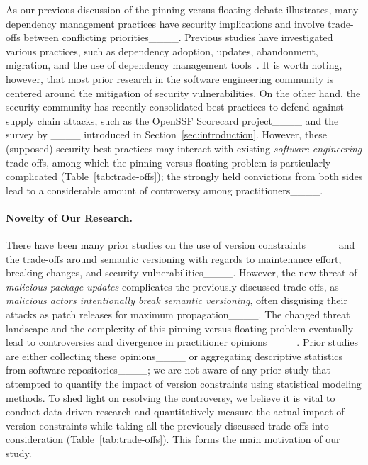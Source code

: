 As our previous discussion of the pinning versus floating debate illustrates, many dependency management practices have security implications and involve trade-offs between conflicting priorities____.
Previous studies have investigated various practices, such as dependency adoption, updates, abandonment, migration, and the use of dependency management tools~\cite[e.g.,][]{DBLP:journals/ese/KulaGOII18, DBLP:conf/sigsoft/VargasATBG20, DBLP:conf/sigsoft/HeHGZ21, DBLP:conf/sigsoft/MillerKV23, DBLP:journals/tse/HeHZZ23}.
It is worth noting, however, that most prior research in the software engineering community is centered around the mitigation of security vulnerabilities.
On the other hand, the security community has recently consolidated best practices to defend against supply chain attacks, such as the OpenSSF Scorecard project____ and the survey by ____ introduced in Section~\ref{sec:introduction}.
However, these (supposed) security best practices may interact with existing \emph{software engineering} trade-offs, among which the pinning versus floating problem is particularly complicated (Table~\ref{tab:trade-offs});  the strongly held convictions from both sides lead to a considerable amount of controversy among practitioners____.

\paragraph{Novelty of Our Research.} 
There have been many prior studies on the use of version constraints____ and the trade-offs  around semantic versioning with regards to maintenance effort, breaking changes, and security vulnerabilities____.
However, the new threat of \textit{malicious package updates} complicates the previously discussed trade-offs, as \emph{malicious actors intentionally break semantic versioning}, often disguising their attacks as patch releases for maximum propagation____.
The changed threat landscape and the complexity of this pinning versus floating problem eventually lead to controversies and divergence in practitioner opinions____.
Prior studies are either collecting these opinions____ or aggregating descriptive statistics from software repositories____; we are not aware of any prior study that attempted to quantify the impact of version constraints using statistical modeling methods.
To shed light on resolving the controversy, we believe it is vital to conduct data-driven research and quantitatively measure the actual impact of version constraints while taking all the previously discussed trade-offs into consideration (Table~\ref{tab:trade-offs}).
This forms the main motivation of our study.